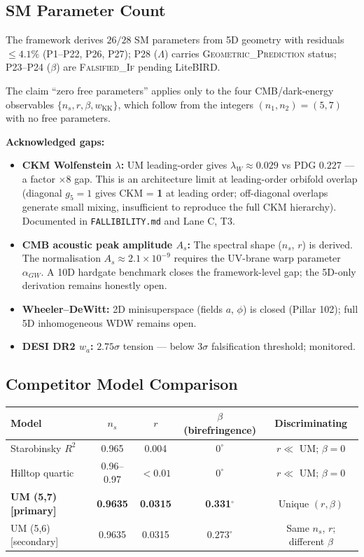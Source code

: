 \documentclass[12pt,a4paper]{article}
\begin{document}
\subsection*{SM Parameter Count}

The framework derives $26/28$ SM parameters from 5D geometry with
residuals $\leq 4.1\%$ (P1--P22, P26, P27); P28 ($\Lambda$) carries
\textsc{Geometric\_Prediction} status; P23--P24 ($\beta$) are
\textsc{Falsified\_If} pending LiteBIRD.

The claim ``zero free parameters'' applies only to the four CMB/dark-energy
observables $\{n_s, r, \beta, w_\mathrm{KK}\}$, which follow from the
integers $(n_1, n_2) = (5, 7)$ with no free parameters.

\textbf{Acknowledged gaps:}
\begin{itemize}
  \item \textbf{CKM Wolfenstein $\lambda$:} UM leading-order gives
        $\lambda_W \approx 0.029$ vs PDG $0.227$ — a factor $\times 8$ gap.
        This is an architecture limit at leading-order orbifold overlap
        (diagonal $g_5 = 1$ gives CKM = \textbf{1} at leading order; off-diagonal
        overlaps generate small mixing, insufficient to reproduce the full CKM
        hierarchy).  Documented in \texttt{FALLIBILITY.md} and Lane C, T3.
  \item \textbf{CMB acoustic peak amplitude $A_s$:} The spectral shape ($n_s$,
        $r$) is derived.  The normalisation $A_s \approx 2.1 \times 10^{-9}$
        requires the UV-brane warp parameter $\alpha_{GW}$.  A 10D hardgate
        benchmark closes the framework-level gap; the 5D-only derivation
        remains honestly open.
  \item \textbf{Wheeler--DeWitt:} 2D minisuperspace (fields $a$, $\phi$) is
        closed (Pillar 102); full 5D inhomogeneous WDW remains open.
  \item \textbf{DESI DR2 $w_a$:} $2.75\sigma$ tension — below $3\sigma$
        falsification threshold; monitored.
\end{itemize}

\subsection*{Competitor Model Comparison}

\begin{center}
\begin{tabular}{lcccc}
\hline
Model & $n_s$ & $r$ & $\beta$ (birefringence) & Discriminating \\
\hline
Starobinsky $R^2$ & 0.965 & 0.004 & $0^\circ$ & $r \ll$ UM; $\beta = 0$ \\
Hilltop quartic & 0.96--0.97 & $<0.01$ & $0^\circ$ & $r \ll$ UM; $\beta = 0$ \\
\textbf{UM (5,7) [primary]} & \textbf{0.9635} & \textbf{0.0315} & \textbf{0.331}$^\circ$ & Unique $(r, \beta)$ \\
UM (5,6) [secondary] & 0.9635 & 0.0315 & $0.273^\circ$ & Same $n_s$, $r$; different $\beta$ \\
\hline
\end{tabular}
\end{center}
\end{document}
